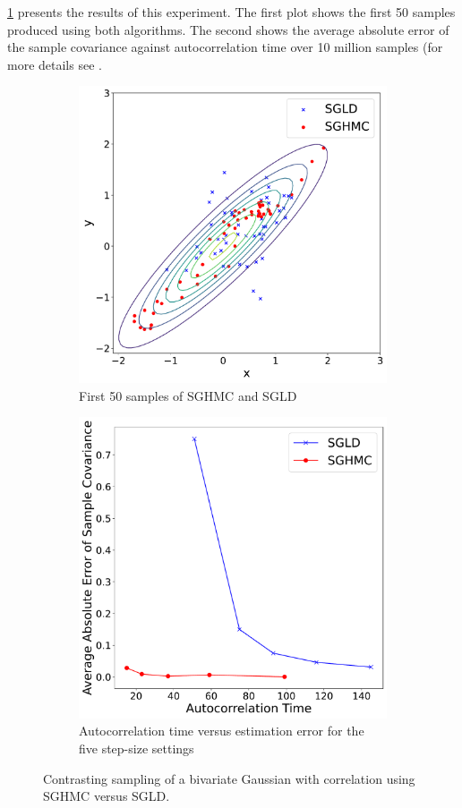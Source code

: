 \cref{fig:sghmc vs sgld} presents the results of this experiment. The first plot shows the first 50 samples produced using both algorithms. The second shows the average absolute error of the sample covariance against autocorrelation time over 10 million samples (for more details see \cite{sghmc}.
\begin{figure}[h!]
  \begin{subfigure}{.5\textwidth}
  \includegraphics[width=.95\linewidth]{parts/Images/fig3b.pdf}
  \caption{First 50 samples of SGHMC and SGLD}
  \end{subfigure}
  \begin{subfigure}{.5\textwidth}
  \includegraphics[width=.95\linewidth]{parts/Images/fig3a.pdf}
  \caption{Autocorrelation time versus estimation error for the five step-size settings}
  \end{subfigure}%
  \caption{Contrasting sampling of a bivariate Gaussian with correlation using SGHMC versus SGLD.}
  \label{fig:sghmc vs sgld}
\end{figure}
